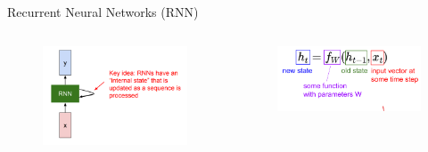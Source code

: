 \begin{frame}[allowframebreaks]{Recurrent Neural Networks (RNN)}
    \begin{columns}
        \begin{column}{0.4\textwidth}
            \begin{figure}
            \centering
            \includegraphics[width=1.0\textwidth,height=1.0\textheight,keepaspectratio]{images/advanced-cv/rnn_1.png}
            \end{figure}
        \end{column}
        \begin{column}{0.6\textwidth}
            \begin{figure}
            \centering
            \includegraphics[width=1.0\textwidth,height=1.0\textheight,keepaspectratio]{images/advanced-cv/rnn_2.png}
            \end{figure}        
        \end{column}
    \end{columns}

\framebreak


\end{frame}
